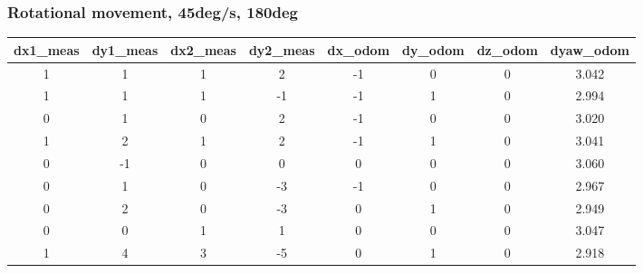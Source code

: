 \documentclass[a4paper, 12pt]{article}
\begin{document}
    \subsubsection{Rotational movement, 45deg/s, 180deg}
    \begin{table}[H]
    \scriptsize
    \begin{tabular}{@{}cccccccc@{}}
    \toprule
    \textbf{dx1\_meas} & \textbf{dy1\_meas} & \textbf{dx2\_meas} & \textbf{dy2\_meas} & \textbf{dx\_odom} & \textbf{dy\_odom} & \textbf{dz\_odom} & \textbf{dyaw\_odom} \\ \midrule
    1                      & 1                      & 1                      & 2                      & -1                & 0                 & 0                 & 3.042               \\
    1                      & 1                      & 1                      & -1                     & -1                & 1                 & 0                 & 2.994               \\
    0                      & 1                      & 0                      & 2                      & -1                & 0                 & 0                 & 3.020               \\
    1                      & 2                      & 1                      & 2                      & -1                & 1                 & 0                 & 3.041               \\
    0                      & -1                     & 0                      & 0                      & 0                 & 0                 & 0                 & 3.060               \\
    0                      & 1                      & 0                      & -3                     & -1                & 0                 & 0                 & 2.967               \\
    0                      & 2                      & 0                      & -3                     & 0                 & 1                 & 0                 & 2.949               \\
    0                      & 0                      & 1                      & 1                      & 0                 & 0                 & 0                 & 3.047               \\
    1                      & 4                      & 3                      & -5                     & 0                 & 1                 & 0                 & 2.918               \\

\end{tabular}
\end{table}
\end{document}
